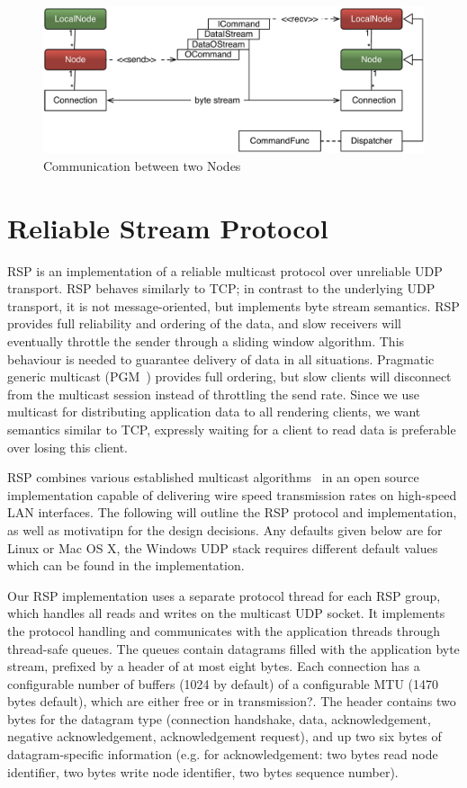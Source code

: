 \begin{figure}[h!t]\center
  \includegraphics[width=\textwidth]{images/netNode.pdf}
  {\caption{\label{fNetNode}Communication between two Nodes}}
\end{figure}

\section{Reliable Stream Protocol}\label{sec:RSP}

RSP is an implementation of a reliable multicast protocol over unreliable UDP
 transport. RSP behaves similarly to TCP; in contrast to the underlying
UDP transport, it is not message-oriented, but implements byte stream semantics.
RSP provides full reliability and ordering of the data, and slow receivers will
eventually throttle the sender through a sliding window algorithm. This behaviour
is needed to guarantee delivery of data in all situations. Pragmatic generic
multicast (PGM~\cite{pgm}) provides full ordering, but slow clients will
disconnect from the multicast session instead of throttling the send rate. Since
we use multicast for distributing application data to all rendering clients, we
want semantics similar to TCP, expressly waiting for a client to read data is
preferable over losing this client.

RSP combines various established multicast
algorithms~\cite{adamson2004negative,Gau:2002} in an open source implementation
capable of delivering wire speed transmission rates on high-speed LAN
interfaces. The following will outline the RSP protocol and implementation,
as well as motivatipn for the design decisions. Any defaults given below are for Linux
or Mac OS X, the Windows UDP stack requires different default values which can be
found in the implementation.

Our RSP implementation uses a separate protocol thread for each RSP group, which
handles all reads and writes on the multicast UDP socket. It implements the
protocol handling and communicates with the application threads through
thread-safe queues. The queues contain datagrams filled with the application
byte stream, prefixed by a header of at most eight bytes. Each connection has a
configurable number of buffers (1024 by default) of a configurable MTU (1470
bytes default), which are either free or in transmission?. The header contains
two bytes for the datagram type (connection handshake, data, acknowledgement,
negative acknowledgement, acknowledgement request), and up two six bytes of
datagram-specific information (e.g. for acknowledgement: two bytes read node
identifier, two bytes write node identifier, two bytes sequence number).

